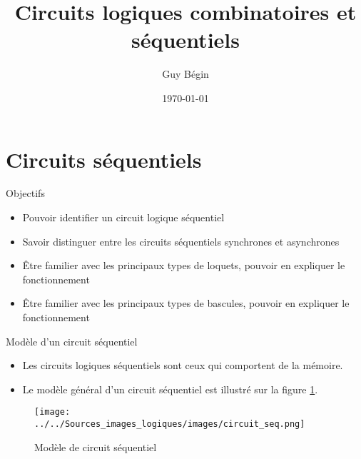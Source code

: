 \documentclass[presentation]{beamer}
\author{Guy Bégin}
\date{\today}
\title{Circuits logiques combinatoires et séquentiels}
\begin{document}
\maketitle

\section{Circuits séquentiels}
\label{sec:org621d0f7}

\begin{frame}[label={sec:org099e9b7}]{Objectifs}
\begin{itemize}
\item Pouvoir identifier un circuit logique séquentiel
\item Savoir distinguer entre les circuits séquentiels synchrones et asynchrones
\item Être familier avec les principaux types de loquets, pouvoir en
expliquer le fonctionnement
\item Être familier avec les principaux types de bascules, pouvoir en
expliquer le fonctionnement
\end{itemize}
\end{frame}

\begin{frame}[label={sec:orgd96dbf8}]{Modèle d'un circuit séquentiel}
\begin{itemize}
\item Les circuits logiques séquentiels sont ceux qui comportent de la mémoire.

\item Le modèle général d'un circuit séquentiel est illustré sur la figure \ref{fig:org41949e9}.
\end{itemize}

\begin{figure}[htbp]
\centering
\texttt{[image: ../../Sources\_images\_logiques/images/circuit\_seq.png]}
\caption{\label{fig:org41949e9}Modèle de circuit séquentiel}
\end{figure}
\end{frame}
\end{document}

